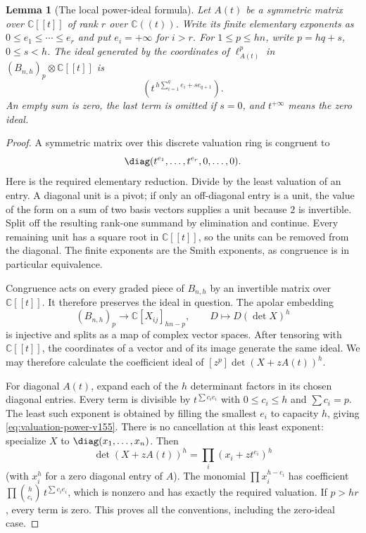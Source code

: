 \documentclass[11pt,reqno]{amsart}
\numberwithin{equation}{section}
\newtheorem{lemma}[theorem]{Lemma}
\theoremstyle{definition}\newtheorem{definition}[theorem]{Definition}
\theoremstyle{remark}\newtheorem{remark}[theorem]{Remark}
\newcommand{\C}{\mathbb C}\newcommand{\Q}{\mathbb Q}
\begin{document}
\begin{lemma}[The local power-ideal formula]
\label{lem:power-valuation-v155}
Let $A(t)$ be a symmetric matrix over $\C[[t]]$ of rank $r$ over
$\C((t))$.  Write its finite elementary exponents as
$0\leq e_1\leq\cdots\leq e_r$ and put $e_i=+\infty$ for $i>r$.
For $1\leq p\leq hn$, write $p=hq+s$, $0\leq s<h$.
The ideal generated by the coordinates of
$\ell_{A(t)}^p$ in $(B_{n,h})_p\otimes\C[[t]]$ is
\begin{equation}\label{eq:valuation-power-v155}
 \left(t^{\,h\sum_{i=1}^q e_i+s e_{q+1}}\right).
\end{equation}
An empty sum is zero, the last term is omitted if $s=0$, and
$t^{+\infty}$ means the zero ideal.
\end{lemma}
\begin{proof}
A symmetric matrix over this discrete valuation ring is congruent
to
\[\diag(t^{e_1},\ldots,t^{e_r},0,\ldots,0).\]
Here is the required elementary reduction.  Divide by the least
valuation of an entry.  A diagonal unit is a pivot; if only an
off-diagonal entry is a unit, the value of the form on a sum of two
basis vectors supplies a unit because $2$ is invertible.  Split
off the resulting rank-one summand by elimination and continue.
Every remaining unit has a square root in $\C[[t]]$, so the units
can be removed from the diagonal.  The finite exponents are the
Smith exponents, as congruence is in particular equivalence.

Congruence acts on every graded piece of $B_{n,h}$ by an invertible
matrix over $\C[[t]]$.  It therefore preserves the ideal in question.
The apolar embedding
\[
 (B_{n,h})_p\longrightarrow
       \C[X_{ij}]_{hn-p},\qquad
       D\longmapsto D(\det X)^h
\]
is injective and splits as a map of complex vector spaces.  After
tensoring with $\C[[t]]$, the coordinates of a vector and of its
image generate the same ideal.  We may therefore calculate the
coefficient ideal of $[z^p]\det(X+zA(t))^h$.

For diagonal $A(t)$, expand each of the $h$ determinant factors
in its chosen diagonal entries.  Every term is divisible by
$t^{\sum c_i e_i}$ with $0\leq c_i\leq h$ and $\sum c_i=p$.
The least such exponent is obtained by filling the smallest $e_i$
to capacity $h$, giving \eqref{eq:valuation-power-v155}.
There is no cancellation at this least exponent: specialize $X$
to $\diag(x_1,\ldots,x_n)$.  Then
\[
 \det(X+zA(t))^h=\prod_i(x_i+zt^{e_i})^h
\]
(with $x_i^h$ for a zero diagonal entry of $A$).
The monomial $\prod x_i^{h-c_i}$ has coefficient
$\prod\binom h{c_i}\,t^{\sum c_i e_i}$, which is nonzero and has
exactly the required valuation.  If $p>hr$, every term is zero.
This proves all the conventions, including the zero-ideal case.
\end{proof}
\end{document}
